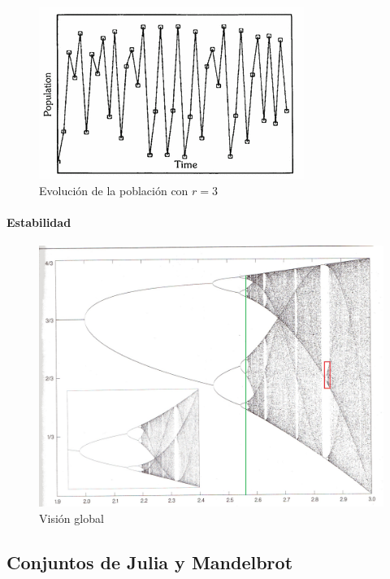 \documentclass[8pt]{beamer}
\begin{document}
\begin{frame}
\begin{minipage}{0.32\textwidth}
\begin{figure}[hbtp]
\centering
\includegraphics[width = \textwidth]{img/r3.png}
\caption{Evolución de la población con $r=3$}
\label{fig:r3}
\end{figure}
\end{minipage}
\end{frame}

\begin{frame}
\framesubtitle{Estabilidad}
\begin{figure}[hbtp]
\centering
\includegraphics[width = 0.7 \textwidth]{img/verhulst6.png}
\caption{Visión global}
\label{fig:global}
\end{figure}
\end{frame}

\subsection{Conjuntos de Julia y Mandelbrot}
\end{document}
